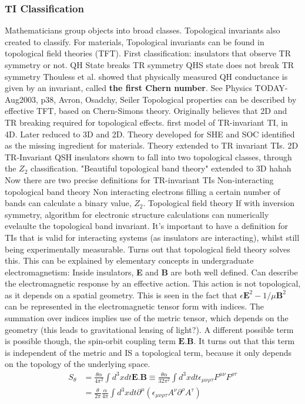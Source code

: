 \documentclass[../mattg_ti-fii_lit-review.tex]{subfiles}
\begin{document}
	\subsubsection{TI Classification}
	\begin{outline}
		\1 Mathematicians group objects into broad classes. Topological invariants also created to classify.
		\1 For materials, Topological invariants can be found in topological field theories (TFT).
		\2 First classification: insulators that observe TR symmetry or not.
		\3 QH State breaks TR symmetry
		\3 QHS state does not break TR symmetry
		\2 Thouless et al. showed that physically measured QH conductance is given by an invariant, called \textbf{the first Chern number}. {See Physics TODAY- Aug2003, p38, Avron, Osadchy, Seiler}
		\2 Topological properties can be described by effective TFT, based on Chern-Simons theory.
		\1 Originally believes that 2D and TR breaking required for topological effects.
		 first model of TR-invariant TI, in 4D.
		\2 Later reduced to 3D and 2D.
		\2 Theory developed for SHE and SOC identified as the missing ingredient for materials.
		\2 Theory extended to TR invariant TIs.
		\2 2D TR-Invariant QSH insulators shown to fall into two topological classes, through the $Z_2$ classification.
		\2 "Beautiful topological band theory" extended to 3D hahah
		\1 Now there are two precise definitions for TR-invariant TIs
		\2 Non-interacting topological band theory
		\3 Non interacting electrons filling a certain number of bands can calculate a binary value, $Z_2$.
		\2 Topological field theory
		\3 If with inversion symmetry, algorithm for electronic structure calculations can numerically evelaulte the topological band invariant.
		\1 It's important to have a definition for TIs that is valid for interacting systems (as insulators are interacting), whilst still being experimentally measurable. Turns out that topological field theory solves this.
		\1 This can be explained by elementary concepts in undergraduate electromagnetism:
		\2 Inside insulators, \textbf{E} and \textbf{B} are both well defined.
		\2 Can describe the electromagnetic response by an effective action.
		\2 This action is not topological, as it depends on a spatial geometry. This is seen in the fact that $\epsilon \textbf{E}^2-1/\mu\textbf{B}^2$ can be represented in the electromagnetic tensor form with indices. The summation over indices implies use of the metric tensor, which depends on the geometry (this leads to gravitational lensing of light?).
		\2 A different possible term is possible though, the spin-orbit coupling term $\textbf{E}.\textbf{B}$. It turns out that this term is independent of the metric and IS a topological term, because it only depends on the topology of the underlying space.
		\begin{align}
		S_\theta &= \frac{\theta\alpha}{4\pi^2}\int d^3xdt \textbf{E.B} \equiv \frac{\theta\alpha}{32\pi^2}\int d^3xdt \epsilon_{\mu\nu\rho\tau}F^{\mu\nu}F^{\rho\tau}\\
		&= \frac{\theta}{2\pi}\frac{\alpha}{4\pi}\int d^3xdt \partial^{\mu}\left(\epsilon_{\mu\nu\rho\tau}A^\nu\partial^\rho A^\tau\right)
		\end{align}
		

\end{outline}
\end{document}
